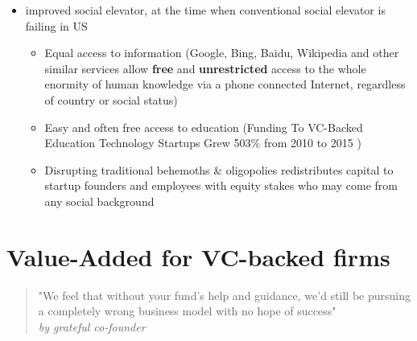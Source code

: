 \begin{itemize}
\begin{itemize}
        \end{itemize}
        \item improved social elevator, at the time when conventional social elevator is failing in US \parencite{elevator:2010}
        \begin{itemize}
            \item Equal access to information (Google, Bing, Baidu, Wikipedia and other similar services allow \textbf{free} and \textbf{unrestricted} access to the whole enormity of human knowledge via a phone connected Internet, regardless of country or social status)
            \item Easy and often free access to education (Funding To VC-Backed Education Technology Startups Grew 503\% from 2010 to 2015 \parencite{edtech:2015} )
            \item Disrupting traditional behemoths & oligopolies redistributes capital to startup founders and employees with equity stakes who may come from any social background
        \end{itemize}
    \end{itemize}
    
    

\section{Value-Added for VC-backed firms}

\begin{quote} 
    \centering 
        "We feel that without your fund's help and guidance, we'd still be pursuing a completely wrong business model with no hope of success"\\
    \raggedleft
        \emph{by grateful co-founder}
\end{quote}

